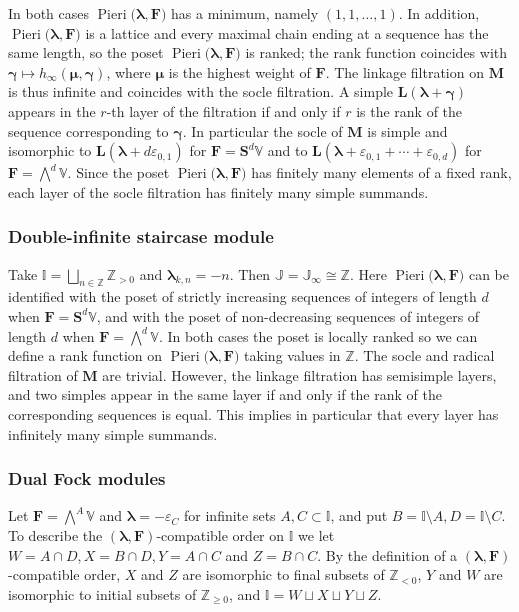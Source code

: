 \documentclass[11pt,fleqn]{amsart}
\newcommand\ZZ{\mathbb Z}
\newcommand\II{\mathbb I}
\newcommand\JJ{\mathbb J}
\renewcommand\epsilon{\varepsilon}
\theoremstyle{definition}
\theoremstyle{remark}
\theoremstyle{remark}
\newcommand\VV{\mathbb V}
\renewcommand\SS{\mathbf S}
\newcommand\wt[1]{\boldsymbol{#1}}
\newcommand\Pieri[2]{\operatorname{Pieri}{(#1},{#2)}}
\begin{document}
In both cases $\Pieri{\wt\lambda}{\mathbf F}$ has a minimum, namely 
$(1,1,\ldots, 1)$. In addition, $\Pieri{\wt\lambda}{\mathbf F}$ is a lattice 
and every maximal chain ending at a sequence has the same length, so the poset
$\Pieri{\wt\lambda}{\mathbf F}$ is ranked; the rank function coincides with 
$\wt\gamma \mapsto h_\infty(\wt\mu, \wt\gamma)$, where $\wt\mu$ is the highest 
weight of $\mathbf F$. The linkage filtration on $\mathbf M$
is thus infinite and coincides with the socle filtration. A simple $\mathbf 
L(\wt\lambda + \wt\gamma)$ appears in the $r$-th layer of the filtration if and 
only if $r$ is the rank of the sequence corresponding to $\wt\gamma$. In 
particular the socle of $\mathbf M$ is simple and isomorphic to $\mathbf 
L(\wt\lambda + d \epsilon_{0,1})$ for $\mathbf F = \SS^d\VV$ and to $\mathbf 
L(\wt\lambda + \epsilon_{0,1} + \cdots + \epsilon_{0,d})$ for $\mathbf F = 
\bigwedge^d \VV$. Since the poset $\Pieri{\wt\lambda}{\mathbf F}$ has finitely 
many elements of a fixed rank, each layer of the socle filtration has finitely 
many simple summands.

\subsubsection{Double-infinite staircase module}
Take $\II = \bigsqcup_{n \in \ZZ} \ZZ_{>0}$ and $\wt \lambda_{k,n} = -n$. Then 
$\JJ = \JJ_{\infty} \cong \ZZ$. Here $\Pieri{\wt\lambda}{\mathbf F}$ can be 
identified with the poset of strictly increasing sequences of integers of length 
$d$ when $\mathbf F = \SS^d\VV$, and with the poset of non-decreasing sequences 
of integers of length $d$ when $\mathbf F =\bigwedge^d \VV$. In both cases the 
poset is locally ranked so we can define a rank function on $\Pieri{\wt\lambda}
{\mathbf F}$ taking values in $\ZZ$. The socle and radical filtration of 
$\mathbf M$ are trivial. However, the linkage filtration has semisimple layers, 
and two simples appear in the same layer if and only if the rank of the 
corresponding sequences is equal. This implies in particular that every layer 
has infinitely many simple summands.

\subsubsection{Dual Fock modules}
Let $\mathbf F = \bigwedge^A \VV$ and $\wt\lambda = -\epsilon_C$ for infinite 
sets $A, C \subset \II$, and put $B = \II \setminus A, D = \II \setminus C$. To 
describe the $(\wt\lambda,\mathbf F)$-compatible order on $\II$ we 
let $W = A \cap D, X = B \cap D, Y = A \cap C$ and $Z = B \cap C$. By the 
definition of a $(\wt\lambda,\mathbf F)$-compatible order, $X$ and $Z$ are 
isomorphic to final subsets of $\ZZ_{<0}$, $Y$ and $W$ are isomorphic to 
initial subsets of $\ZZ_{\geq 0}$, and $\II = W \sqcup X \sqcup Y \sqcup Z$. 
\end{document}
